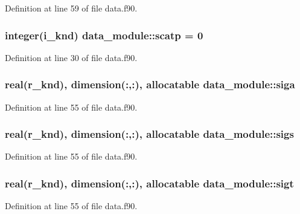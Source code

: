 Definition at line 59 of file data.\-f90.

\hypertarget{classdata__module_a7ac9af7f12e8f03d3ba40fa78904d5a1}{
\subsubsection[{scatp}]{\setlength{\rightskip}{0pt plus 5cm}integer(i\-\_\-knd) data\-\_\-module\-::scatp = 0}}\label{classdata__module_a7ac9af7f12e8f03d3ba40fa78904d5a1}


Definition at line 30 of file data.\-f90.

\hypertarget{classdata__module_a536d3b44d8d6b245eabd2672f5cc8d65}{
\subsubsection[{siga}]{\setlength{\rightskip}{0pt plus 5cm}real(r\-\_\-knd), dimension(\-:,\-:), allocatable data\-\_\-module\-::siga}}\label{classdata__module_a536d3b44d8d6b245eabd2672f5cc8d65}


Definition at line 55 of file data.\-f90.

\hypertarget{classdata__module_a198158103501dbae827a7ccee2a1f91f}{
\subsubsection[{sigs}]{\setlength{\rightskip}{0pt plus 5cm}real(r\-\_\-knd), dimension(\-:,\-:), allocatable data\-\_\-module\-::sigs}}\label{classdata__module_a198158103501dbae827a7ccee2a1f91f}


Definition at line 55 of file data.\-f90.

\hypertarget{classdata__module_a3455329887f17be6b34eaa771348a3bf}{
\subsubsection[{sigt}]{\setlength{\rightskip}{0pt plus 5cm}real(r\-\_\-knd), dimension(\-:,\-:), allocatable data\-\_\-module\-::sigt}}\label{classdata__module_a3455329887f17be6b34eaa771348a3bf}


Definition at line 55 of file data.\-f90.

